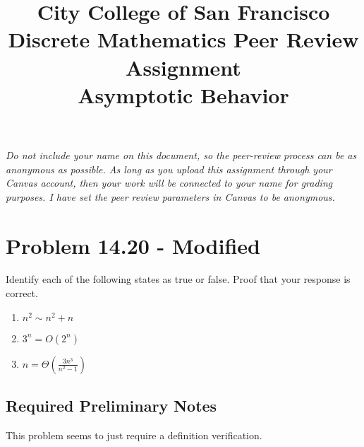 \documentclass[fleqn,10pt]{olplainarticle}
\title{
    \normalsize{
        City College of San Francisco
    }\\
    \large{
        Discrete Mathematics Peer Review Assignment
    }\\
    \vspace{0.5ex}
    \Huge{
        Asymptotic Behavior
    }
    \vspace{0.5ex}
}
\author{} %
\begin{document}
    \maketitle
    \flushbottom
    
    \thispagestyle{empty} 
    
    \textit{Do not include your name on this document, so the peer-review process can be as anonymous as possible. As long as you upload this assignment through your Canvas account, then your work will be connected to your name for grading purposes. I have set the peer review parameters in Canvas to be anonymous.}

            
    \section*{Problem 14.20 - Modified}
        Identify each of the following states as true or false. Proof that your response is correct.
        
        \begin{enumerate}
            \item $n^2 \sim n^2 + n$
            \item $3^n = O\left(2^n\right)$
            \item $n = \Theta\left(\frac{3n^3}{n^2 - 1}\right)$
        \end{enumerate}
        
        \subsection*{Required Preliminary Notes}
        
            This problem seems to just require a definition verification.
            
\end{document}
